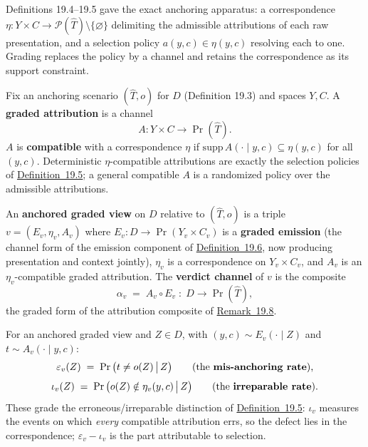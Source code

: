 
Definitions 19.4--19.5 gave the exact anchoring apparatus: a correspondence \(\eta : Y \times C \to \mathcal{P}(\widehat{T}) \setminus \{\varnothing\}\) delimiting the admissible attributions of each raw presentation, and a selection policy \(a(y,c) \in \eta(y,c)\) resolving each to one. Grading replaces the policy by a channel and retains the correspondence as its support constraint.

\begin{thmdef}

Fix an anchoring scenario \((\widehat{T}, o)\) for \(D\) (Definition 19.3) and spaces \(Y, C\). A \textbf{graded attribution} is a channel
\[
A : Y \times C \to \Pr(\widehat{T}).
\]
\(A\) is \textbf{compatible} with a correspondence \(\eta\) if \(\mathrm{supp}\, A(\cdot \mid y, c) \subseteq \eta(y, c)\) for all \((y,c)\). Deterministic \(\eta\)-compatible attributions are exactly the selection policies of \hyperlink{stmt:19.5}{Definition~19.5}; a general compatible \(A\) is a randomized policy over the admissible attributions.
\end{thmdef}

\begin{thmdef}

An \textbf{anchored graded view} on \(D\) relative to \((\widehat{T}, o)\) is a triple \(v = (E_v, \eta_v, A_v)\) where \(E_v : D \to \Pr(Y_v \times C_v)\) is a \textbf{graded emission} (the channel form of the emission component of \hyperlink{stmt:19.6}{Definition~19.6}, now producing presentation and context jointly), \(\eta_v\) is a correspondence on \(Y_v \times C_v\), and \(A_v\) is an \(\eta_v\)-compatible graded attribution. The \textbf{verdict channel} of \(v\) is the composite
\[
\alpha_v \;=\; A_v \circ E_v \;:\; D \to \Pr(\widehat{T}),
\]
the graded form of the attribution composite of \hyperlink{stmt:19.8}{Remark~19.8}.
\end{thmdef}

\begin{thmdef}

For an anchored graded view and \(Z \in D\), with \((y,c) \sim E_v(\cdot \mid Z)\) and \(t \sim A_v(\cdot \mid y, c)\):
\[
\varepsilon_v(Z) \;=\; \Pr\big( t \ne o(Z) \,\big|\, Z \big)
\qquad\text{(the \textbf{mis-anchoring rate}),}
\]
\[
\iota_v(Z) \;=\; \Pr\big( o(Z) \notin \eta_v(y, c) \,\big|\, Z \big)
\qquad\text{(the \textbf{irreparable rate}).}
\]
These grade the erroneous/irreparable distinction of \hyperlink{stmt:19.5}{Definition~19.5}: \(\iota_v\) measures the events on which \emph{every} compatible attribution errs, so the defect lies in the correspondence; \(\varepsilon_v - \iota_v\) is the part attributable to selection.
\end{thmdef}


